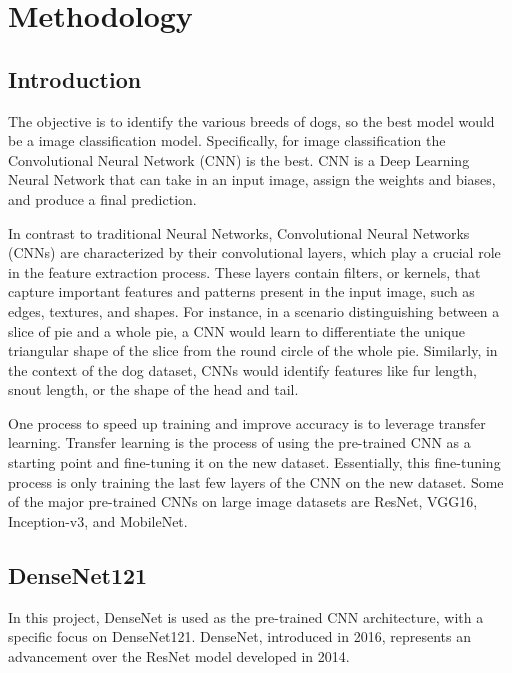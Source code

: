 \documentclass[11pt]{article}
\begin{document}


\section{Methodology}

\subsection{Introduction}

The objective is to identify the various breeds of dogs, so the best model would be a image classification model. Specifically, for image classification the Convolutional Neural Network (CNN) is the best. CNN is a Deep Learning Neural Network that can take in an input image, assign the weights and biases, and produce a final prediction\cite{cnn}.  

In contrast to traditional Neural Networks, Convolutional Neural Networks (CNNs) are characterized by their convolutional layers, which play a crucial role in the feature extraction process. These layers contain filters, or kernels, that capture important features and patterns present in the input image, such as edges, textures, and shapes. For instance, in a scenario distinguishing between a slice of pie and a whole pie, a CNN would learn to differentiate the unique triangular shape of the slice from the round circle of the whole pie. Similarly, in the context of the dog dataset, CNNs would identify features like fur length, snout length, or the shape of the head and tail.

One process to speed up training and improve accuracy is to leverage transfer learning. Transfer learning is the process of using the pre-trained CNN as a starting point and fine-tuning it on the new dataset. Essentially, this fine-tuning process is only training the last few layers of the CNN on the new dataset. Some of the major pre-trained CNNs on large image datasets are ResNet, VGG16, Inception-v3, and MobileNet.

\subsection{DenseNet121}

In this project, DenseNet is used as the pre-trained CNN architecture, with a specific focus on DenseNet121. DenseNet, introduced in 2016, represents an advancement over the ResNet model developed in 2014\cite{timeline}. 
\end{document}
